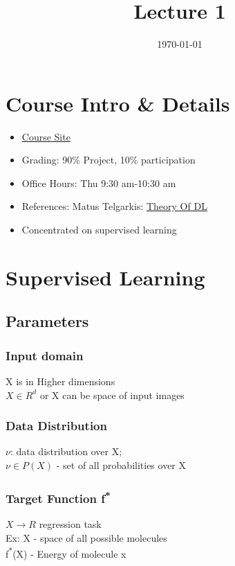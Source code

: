 \documentclass[11pt]{article}
\date{\today}
\title{Lecture 1}
\begin{document}
\maketitle
\section{Course Intro \& Details}
\label{sec:org5c12662}
\begin{itemize}
\item \href{https://www.notion.so/Mathematics-of-Deep-Learning-05cd9255f03842489083ec7cbb6338d5}{Course Site}\\
\item Grading: 90\% Project, 10\% participation\\
\item Office Hours: Thu 9:30 am-10:30 am\\
\item References: Matus Telgarkis: \href{https://mjt.cs.illinois.edu/courses/dlt-f20/}{Theory Of DL}\\
\item Concentrated on supervised learning\\
\end{itemize}

\section{Supervised Learning}
\label{sec:org83cf97d}
\subsection{Parameters}
\label{sec:orgdb1ab58}
\subsubsection{Input domain}
\label{sec:org1b76647}
  X is in Higher dimensions\\
\(X \in R^d\) or X can be space of input images\\
\subsubsection{Data Distribution}
\label{sec:org6d80636}
\(\nu\): data distribution over X;\\
\(\nu \in P(X)\) - set of all probabilities over X\\
\subsubsection{Target Function f\textsuperscript{*}}
\label{sec:orgc594cc6}
\(X \to R\) regression task\\
Ex: X      - space of all possible molecules\\
    f\textsuperscript{*}(X) - Energy of molecule x\\
\end{document}
